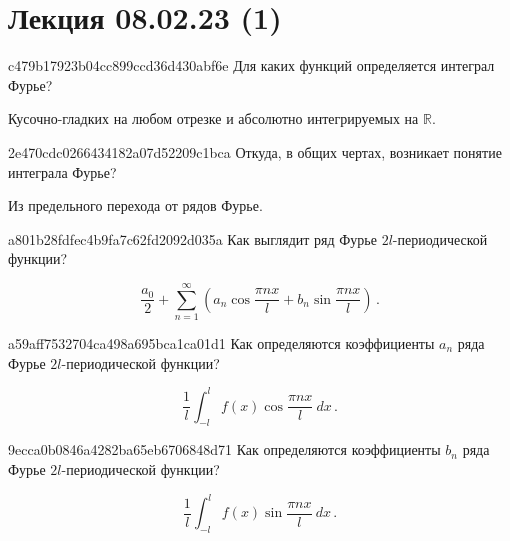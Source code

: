 


\section{Лекция 08.02.23 (1)}
\begin{note}{c479b17923b04cc899ccd36d430abf6e}
    Для каких функций определяется интеграл Фурье?

    \begin{cloze}{1}
        Кусочно-гладких на любом отрезке и абсолютно интегрируемых на \({ \mathbb R }\).
    \end{cloze}
\end{note}

\begin{note}{2e470cdc0266434182a07d52209c1bca}
    Откуда, в общих чертах, возникает понятие интеграла Фурье?

    \begin{cloze}{1}
        Из предельного перехода от рядов Фурье.
    \end{cloze}
\end{note}

\begin{note}{a801b28fdfec4b9fa7c62fd2092d035a}
    Как выглядит ряд Фурье \({ 2l }\)-периодической функции?

    \begin{cloze}{1}
        \[
            \frac{a_0}{2} + \sum_{n=1}^{\infty}(a_n \cos \frac{\pi nx}{l} + b_n \sin \frac{\pi nx}{l})\,.
        \]
    \end{cloze}
\end{note}

\begin{note}{a59aff7532704ca498a695bca1ca01d1}
    Как определяются коэффициенты \({ a_n }\) ряда Фурье \({ 2l }\)-пери\-о\-ди\-чес\-кой функции?

    \begin{cloze}{1}
        \[
            \frac{1}{l} \int_{-l}^{l} f(x) \cos \frac{\pi nx}{l}\: dx\,.
        \]
    \end{cloze}
\end{note}

\begin{note}{9ecca0b0846a4282ba65eb6706848d71}
    Как определяются коэффициенты \({ b_n }\) ряда Фурье \({ 2l }\)-пери\-о\-ди\-чес\-кой функции?

    \begin{cloze}{1}
        \[
            \frac{1}{l} \int_{-l}^{l} f(x) \sin \frac{\pi nx}{l}\: dx\,.
        \]
    \end{cloze}
\end{note}

